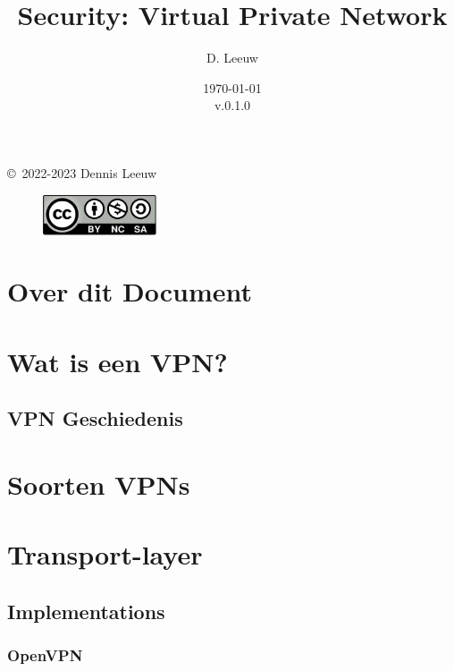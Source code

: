\documentclass[a4paper,12pt,twoside,openright,titlepage]{book}
\author{D. Leeuw}
\title{Security: Virtual Private Network}
\date{\today\\v.0.1.0}
\begin{document}

\maketitle

\copyright\ 2022-2023 Dennis Leeuw\\

\begin{figure}[H]
\includegraphics[width=0.3\textwidth]{CC-BY-SA-NC.png}
\end{figure}

\bigskip




\frontmatter
\chapter{Over dit Document}



\tableofcontents

\mainmatter

\chapter{Wat is een VPN?}

\section{VPN Geschiedenis}


\chapter{Soorten VPNs}


\chapter{Transport-layer}
\section{Implementations}
\subsection{OpenVPN}
\end{document}
